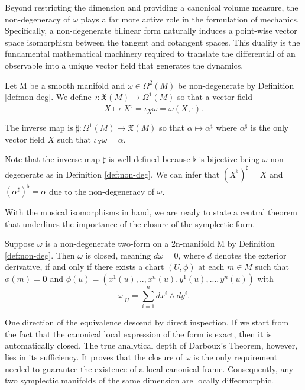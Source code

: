 Beyond restricting the dimension and providing a canonical volume measure, the non-degeneracy of $\omega$ plays a far more active role in the formulation of mechanics. Specifically, a non-degenerate bilinear form naturally induces a point-wise vector space isomorphism between the tangent and cotangent spaces. This duality is the fundamental mathematical machinery required to translate the differential of an observable into a unique vector field that generates the dynamics.

\begin{definition}\label{def:musical}
	Let M be a smooth manifold and $\omega \in \Omega^2(M)$ be non-degenerate by Definition \ref{def:non-deg}. We define $\flat :\mathfrak{X}(M) \to \Omega^1(M)$ so that a vector field $$X \mapsto X^\flat = \iota_X\omega = \omega(X, \cdot).$$ 
	
	The inverse map is $\sharp: \Omega^1(M) \to \mathfrak{X}(M)$ so that $\alpha \mapsto \alpha^\sharp$ where $\alpha^\sharp$ is the only vector field $X$ such that $\iota_X \omega= \alpha$.
\end{definition}

\begin{remark}
	Note that the inverse map $\sharp$ is well-defined because $\flat$ is bijective being $\omega$ non-degenerate as in Definition \ref{def:non-deg}. We can infer that $(X^\flat)^\sharp = X$ and $(\alpha^\sharp)^\flat = \alpha$ due to the non-degeneracy of $\omega$.
\end{remark}

\noindent With the musical isomorphisms in hand, we are ready to state a central theorem that underlines the importance of the closure of the symplectic form.

\begin{theorem}\label{thm:darboux}
	Suppose $\omega$ is a non-degenerate two-form on a 2n-manifold M by Definition \ref{def:non-deg}. Then $\omega$ is closed, meaning $d \omega = 0$, where $d$ denotes the exterior derivative, if and only if there exists a chart $(U, \phi)$ at each $m \in M$ such that $\phi(m) = \boldsymbol{0}$ and $\phi(u) = (x^1(u),..,x^n(u), y^1(u),...,y^n(u))$ with
	\[
		\omega|_U = \sum_{i=1}^n dx^i \wedge dy^i.
	\]
\end{theorem}

\begin{remark}\label{rem:darboux-consequences}
	One direction of the equivalence descend by direct inspection. If we start from the fact that the canonical local expression of the form is exact, then it is automatically closed. The true analytical depth of Darboux's Theorem, however, lies in its sufficiency. It proves that the closure of $\omega$ is the only requirement needed to guarantee the existence of a local canonical frame. Consequently, any two symplectic manifolds of the same dimension are locally diffeomorphic.
\end{remark}

